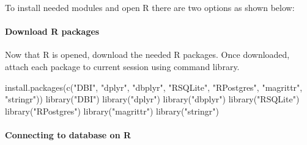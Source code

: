 \documentclass[
]{article}
\newenvironment{Shaded}{\begin{snugshade}}{\end{snugshade}}
\newcommand{\BuiltInTok}[1]{#1}
\newcommand{\CommentTok}[1]{\textcolor[rgb]{0.56,0.35,0.01}{\textit{#1}}}
\newcommand{\ExtensionTok}[1]{#1}
\newcommand{\FunctionTok}[1]{\textcolor[rgb]{0.00,0.00,0.00}{#1}}
\newcommand{\NormalTok}[1]{#1}
\newcommand{\StringTok}[1]{\textcolor[rgb]{0.31,0.60,0.02}{#1}}
\newcommand{\VariableTok}[1]{\textcolor[rgb]{0.00,0.00,0.00}{#1}}
\begin{document}
To install needed modules and open R there are two options as shown
below:

\begin{Shaded}
\end{Shaded}

\hypertarget{download-r-packages}{%
\paragraph{Download R packages}\label{download-r-packages}}

Now that R is opened, download the needed R packages. Once downloaded,
attach each package to current session using command library.

\begin{Shaded}
\begin{Highlighting}[]
\FunctionTok{install.packages}\NormalTok{(}\FunctionTok{c}\NormalTok{(}\StringTok{"DBI"}\NormalTok{, }\StringTok{"dplyr"}\NormalTok{, }\StringTok{"dbplyr"}\NormalTok{,}
                   \StringTok{"RSQLite"}\NormalTok{, }\StringTok{"RPostgres"}\NormalTok{, }
                   \StringTok{"magrittr"}\NormalTok{, }\StringTok{"stringr"}\NormalTok{))}
\FunctionTok{library}\NormalTok{(}\StringTok{"DBI"}\NormalTok{)}
\FunctionTok{library}\NormalTok{(}\StringTok{"dplyr"}\NormalTok{)}
\FunctionTok{library}\NormalTok{(}\StringTok{"dbplyr"}\NormalTok{)}
\FunctionTok{library}\NormalTok{(}\StringTok{"RSQLite"}\NormalTok{)}
\FunctionTok{library}\NormalTok{(}\StringTok{"RPostgres"}\NormalTok{)}
\FunctionTok{library}\NormalTok{(}\StringTok{"magrittr"}\NormalTok{)}
\FunctionTok{library}\NormalTok{(}\StringTok{"stringr"}\NormalTok{)}
\end{Highlighting}
\end{Shaded}

\hypertarget{connecting-to-database-on-r}{%
\paragraph{Connecting to database on
R}\label{connecting-to-database-on-r}}
\end{document}
